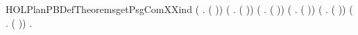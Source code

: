 \begin{SaveVerbatim}{HOLPlanPBDefTheoremsgetPsgComXXind}
     (\HOLSymConst{\HOLTokenForall{}}  .   \HOLSymConst{\HOLTokenImp{}}  (  \HOLSymConst{::})) \HOLSymConst{\HOLTokenConj{}}
     (\HOLSymConst{\HOLTokenForall{}}  .   \HOLSymConst{\HOLTokenImp{}}  (  \HOLSymConst{::})) \HOLSymConst{\HOLTokenConj{}}
     (\HOLSymConst{\HOLTokenForall{}}  .   \HOLSymConst{\HOLTokenImp{}}  (  \HOLSymConst{::})) \HOLSymConst{\HOLTokenConj{}}
     (\HOLSymConst{\HOLTokenForall{}}  .   \HOLSymConst{\HOLTokenImp{}}  (  \HOLSymConst{::})) \HOLSymConst{\HOLTokenConj{}}
     (\HOLSymConst{\HOLTokenForall{}}  .   \HOLSymConst{\HOLTokenImp{}}  (  \HOLSymConst{::})) \HOLSymConst{\HOLTokenConj{}}
     (\HOLSymConst{\HOLTokenForall{}}  .   \HOLSymConst{\HOLTokenImp{}}  (  \HOLSymConst{::})) \HOLSymConst{\HOLTokenImp{}}
     \HOLSymConst{\HOLTokenForall{}}.  
\end{SaveVerbatim}
\newcommand{\HOLPlanPBDefTheoremsgetPsgComXXind}{\UseVerbatim{HOLPlanPBDefTheoremsgetPsgComXXind}}
